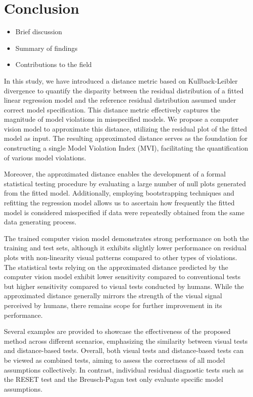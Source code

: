 \documentclass[]{interact}
\theoremstyle{plain}%
\theoremstyle{definition}
\theoremstyle{remark}
\providecommand{\tightlist}{%
  \setlength{\itemsep}{0pt}\setlength{\parskip}{0pt}}
\def\tightlist{}
\begin{document}
\section{Conclusion}\label{conclusion}

\begin{itemize}
\tightlist
\item
  Brief discussion
\item
  Summary of findings
\item
  Contributions to the field
\end{itemize}

In this study, we have introduced a distance metric based on
Kullback-Leibler divergence to quantify the disparity between the
residual distribution of a fitted linear regression model and the
reference residual distribution assumed under correct model
specification. This distance metric effectively captures the magnitude
of model violations in misspecified models. We propose a computer vision
model to approximate this distance, utilizing the residual plot of the
fitted model as input. The resulting approximated distance serves as the
foundation for constructing a single Model Violation Index (MVI),
facilitating the quantification of various model violations.

Moreover, the approximated distance enables the development of a formal
statistical testing procedure by evaluating a large number of null plots
generated from the fitted model. Additionally, employing bootstrapping
techniques and refitting the regression model allows us to ascertain how
frequently the fitted model is considered misspecified if data were
repeatedly obtained from the same data generating process.

The trained computer vision model demonstrates strong performance on
both the training and test sets, although it exhibits slightly lower
performance on residual plots with non-linearity visual patterns
compared to other types of violations. The statistical tests relying on
the approximated distance predicted by the computer vision model exhibit
lower sensitivity compared to conventional tests but higher sensitivity
compared to visual tests conducted by humans. While the approximated
distance generally mirrors the strength of the visual signal perceived
by humans, there remains scope for further improvement in its
performance.

Several examples are provided to showcase the effectiveness of the
proposed method across different scenarios, emphasizing the similarity
between visual tests and distance-based tests. Overall, both visual
tests and distance-based tests can be viewed as combined tests, aiming
to assess the correctness of all model assumptions collectively. In
contrast, individual residual diagnostic tests such as the RESET test
and the Breusch-Pagan test only evaluate specific model assumptions.
\end{document}
